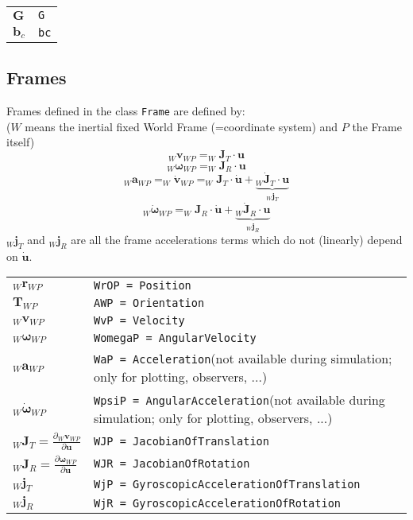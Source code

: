 \documentclass{article}
\newcommand{\bs}[1]{\boldsymbol #1}
\begin{document}
\begin{tabular}{|l|l|}
  \hline
  $\bs{G}$ & \texttt{G} \\
  $\bs{b}_c$ & \texttt{bc} \\
  \hline
\end{tabular}



\subsection{Frames}

Frames defined in the class \texttt{Frame} are defined by:\\
($W$ means the inertial fixed World Frame (=coordinate system) and $P$ the Frame itself)
\begin{equation}
  _W\bs{v}_{WP}=_W\bs{J}_T \cdot \bs{u}
\end{equation}
\begin{equation}
  _W\bs{\omega}_{WP}=_W\bs{J}_R \cdot \bs{u}
\end{equation}
\begin{equation}
  _W\bs{a}_{WP}=_W\dot{\bs{v}}_{WP}=_W\bs{J}_T \cdot \dot{\bs{u}} + \underbrace{_W\dot{\bs{J}}_T \cdot \bs{u}}_{_W\bs{j}_T}
\end{equation}
\begin{equation}
  _W\dot{\bs{\omega}}_{WP}=_W\bs{J}_R \cdot \dot{\bs{u}} + \underbrace{_W\dot{\bs{J}}_R \cdot \bs{u}}_{_W\bs{j}_R}
\end{equation}
$_W\bs{j}_T$ and $_W\bs{j}_R$ are all the frame accelerations terms which do not (linearly) depend on $\dot{\bs{u}}$.

\begin{tabular}{|l|p{10cm}|}
  \hline
  $_W\bs{r}_{WP}$ & \texttt{WrOP = Position} \\
  $\bs{T}_{WP}$ & \texttt{AWP = Orientation} \\
  $_W\bs{v}_{WP}$ & \texttt{WvP = Velocity} \\
  $_W\bs{\omega}_{WP}$ & \texttt{WomegaP = AngularVelocity} \\
  $_W\bs{a}_{WP}$ & \texttt{WaP = Acceleration}\newline(not available during simulation; only for plotting, observers, ...) \\
  $_W\dot{\bs{\omega}}_{WP}$ & \texttt{WpsiP = AngularAcceleration}\newline(not available during simulation; only for plotting, observers, ...) \\
  $_W\bs{J}_T=\frac{\partial_W\bs{v}_{WP}}{\partial\bs{u}}$ & \texttt{WJP = JacobianOfTranslation} \\
  $_W\bs{J}_R=\frac{\partial\bs{\omega}_{WP}}{\partial\bs{u}}$ & \texttt{WJR = JacobianOfRotation} \\
  $_W\bs{j}_T$ & \texttt{WjP = GyroscopicAccelerationOfTranslation} \\
  $_W\bs{j}_R$ & \texttt{WjR = GyroscopicAccelerationOfRotation} \\
  \hline
\end{tabular}
\end{document}
